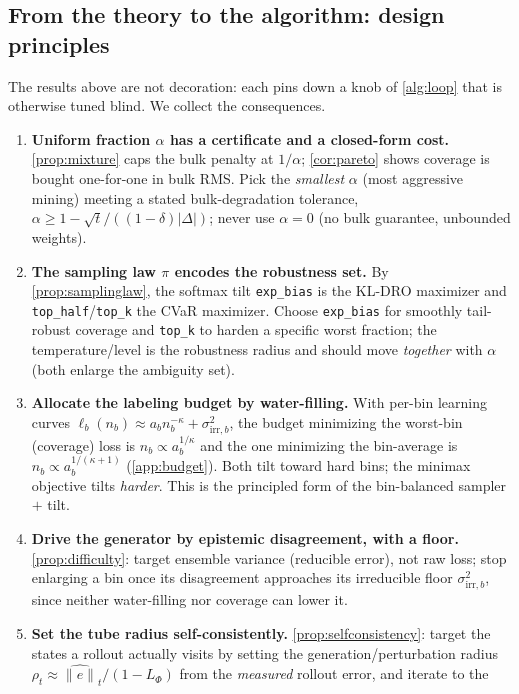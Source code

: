 \documentclass{article}
\theoremstyle{plain}
\theoremstyle{definition}
\theoremstyle{remark}
\newcommand{\sol}{\Phi}
\newcommand{\unif}{\alpha}
\begin{document}
\subsection{From the theory to the algorithm: design principles}\label{sec:method-design}
The results above are not decoration: each pins down a knob of \cref{alg:loop} that is otherwise tuned
blind. We collect the consequences.
\begin{enumerate}[label=\textbf{P\arabic*.},leftmargin=2.6em,topsep=3pt,itemsep=3pt]
\item \textbf{Uniform fraction $\unif$ has a certificate and a closed-form cost.} \cref{prop:mixture} caps
the bulk penalty at $1/\unif$; \cref{cor:pareto} shows coverage is bought one-for-one in bulk RMS. Pick the
\emph{smallest} $\unif$ (most aggressive mining) meeting a stated bulk-degradation tolerance,
$\unif\ge1-\sqrt{t}/((1-\delta)|\Delta|)$; never use $\unif=0$ (no bulk guarantee, unbounded weights).
\item \textbf{The sampling law $\pi$ encodes the robustness set.} By \cref{prop:samplinglaw}, the softmax
tilt \texttt{exp\_bias} is the KL-DRO maximizer and \texttt{top\_half}/\texttt{top\_k} the CVaR maximizer.
Choose \texttt{exp\_bias} for smoothly tail-robust coverage and \texttt{top\_k} to harden a specific worst
fraction; the temperature/level is the robustness radius and should move \emph{together} with $\unif$
(both enlarge the ambiguity set).
\item \textbf{Allocate the labeling budget by water-filling.} With per-bin learning curves
$\ell_b(n_b)\approx a_b n_b^{-\kappa}+\sigma^2_{\mathrm{irr},b}$, the budget minimizing the worst-bin
(coverage) loss is $n_b\propto a_b^{1/\kappa}$ and the one minimizing the bin-average is
$n_b\propto a_b^{1/(\kappa+1)}$ (\cref{app:budget}). Both tilt toward hard bins; the minimax objective
tilts \emph{harder}. This is the principled form of the bin-balanced sampler $+$ tilt.
\item \textbf{Drive the generator by epistemic disagreement, with a floor.} \cref{prop:difficulty}: target
ensemble variance (reducible error), not raw loss; stop enlarging a bin once its disagreement approaches
its irreducible floor $\sigma^2_{\mathrm{irr},b}$, since neither water-filling nor coverage can lower it.
\item \textbf{Set the tube radius self-consistently.} \cref{prop:selfconsistency}: target the states a
rollout actually visits by setting the generation/perturbation radius
$\rho_t\!\approx\!\widehat{\|e\|}_t/(1-L_{\sol})$ from the \emph{measured} rollout error, and iterate to the

\end{enumerate}
\end{document}
